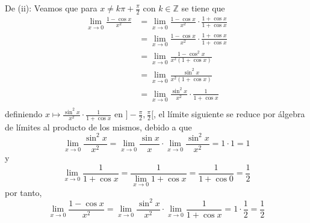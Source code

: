 \documentclass[12pt]{article}
\begin{document}
\begin{enumerate}
\begin{sol}
        De (ii): Veamos que para $x\neq k\pi+\frac{\pi}{2}$ con $k\in\mathbb{Z}$ se tiene que
        \begin{equation*}
            \begin{split}
                \lim_{x\rightarrow 0}\frac{1-\cos x}{x^2}&=\lim_{x\rightarrow 0}\frac{1-\cos x}{x^2}\cdot\frac{1+\cos x}{1+\cos x}\\
                &=\lim_{x\rightarrow 0}\frac{1-\cos x}{x^2}\cdot\frac{1+\cos x}{1+\cos x}\\
                &=\lim_{x\rightarrow 0}\frac{1-\cos^2 x}{x^2(1+\cos x)}\\
                &=\lim_{x\rightarrow 0}\frac{\sin^2 x}{x^2(1+\cos x)}\\
                &=\lim_{x\rightarrow 0}\frac{\sin^2 x}{x^2}\cdot\frac{1}{1+\cos x} \\
            \end{split}
        \end{equation*}
        definiendo $x\mapsto \frac{\sin^ 2 x}{x^2}\cdot\frac{1}{1+\cos x}$ en $]-\frac{\pi}{2},\frac{\pi}{2}[$, el límite siguiente se reduce por álgebra de límites al producto de los mismos, debido a que
        \begin{equation*}
            \lim_{x\rightarrow 0}\frac{\sin^2 x}{x^2}=\lim_{x\rightarrow 0}\frac{\sin x}{x}\cdot\lim_{x\rightarrow 0}\frac{\sin^2 x}{x^2}=1\cdot 1 =1
        \end{equation*}
        y
        \begin{equation*}
            \lim_{x\rightarrow 0}\frac{1}{1+\cos x}=\frac{1}{\lim_{x\rightarrow 0}1+\cos x }=\frac{1}{1+\cos0 }=\frac{1}{2}
        \end{equation*}
        por tanto,
        \begin{equation*}
            \lim_{x\rightarrow 0}\frac{1-\cos x}{x^2}=\lim_{x\rightarrow 0}\frac{\sin^2 x}{x^2}\cdot\lim_{ x\rightarrow 0}\frac{1}{1+\cos x}=1\cdot\frac{1}{2}=\frac{1}{2}
        \end{equation*}


\end{sol}
\end{enumerate}
\end{document}
